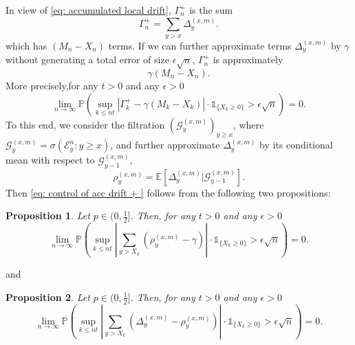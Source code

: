 \documentclass[twoside,12pt,a4paper]{article}
\newtheorem{proposition}{Proposition}[section]
\numberwithin{equation}{section}
\newcommand{\abs}[1]{\left\vert #1 \right\vert}
\begin{document}
In view of \eqref{eq: accumulated local drift}, $\Gamma_n^+$ is the sum 
$$
\Gamma_n^+ = \sum_{y>x} \Delta_y^{(x,m)}.
$$ which has $(M_n - X_n)$ terms. If we can further approximate terms $\Delta_y^{(x,m)}$ by $\gamma$ without generating a total error of size $\epsilon \sqrt{n}$, $\Gamma_n^+$ is approximately 
$$   
 \gamma (M_n - X_n).
$$
More precisely,for any $t>0$ and any $\epsilon >0$
\begin{equation}\label{eq: control of acc drift + }
	\lim_{n \to \infty }\mathbb{P}\left(\sup_{k\leq nt} \abs{\Gamma^+_k - \gamma \left(M_k - X_k \right)   }\cdot \mathbb{1}_{\{X_k\geq 0 \}} > \epsilon \sqrt{n}  \right) =0. 
\end{equation}
To this end, we consider the filtration $\left(\mathcal{G}_{y}^{(x,m)}\right)_{y\geq x}$, where $ \mathcal{G}_{y}^{(x,m)} = \sigma\left( \mathcal{E}^{n}_y : y \geq x \right)$, and further approximate $\Delta_y^{(x,m)}$ by its conditional mean with respect to $\mathcal{G}_{y-1}^{(x,m)}$,
\begin{equation}\label{eq: conditional mean}
	\rho_{y}^{(x,m)}= \mathbb{E}\left[\Delta_y^{(x,m)} | \mathcal{G}_{y-1}^{(x,m)}\right].
\end{equation}
Then \eqref{eq: control of acc drift + } follows from the following two propositions:
\begin{proposition}\label{lm: approximation of means of local drift}
		Let $p\in (0,\frac{1}{2}]$. Then, for any $t>0$ and any $\epsilon >0$
		\begin{equation}\label{eq: control of expected local drift}
			\lim_{n \to \infty }\mathbb{P}\left(\sup_{k\leq nt} \abs{\sum_{y> X_k} \left( \rho_{y}^{(x,m)} - \gamma  \right)   }\cdot\mathbb{1}_{\{X_k\geq 0\}} > \epsilon \sqrt{n}  \right) =0. 
		\end{equation}
\end{proposition}
and
\begin{proposition}\label{lm: approx local drift by conditional means}
	Let $p\in (0,\frac{1}{2}]$. Then, for any $t>0$ and any $\epsilon >0$
	\begin{equation}\label{eq: control of martingale difference for local drift}
		\lim_{n \to \infty }\mathbb{P}\left(\sup_{k\leq nt} \abs{\sum_{y> X_k} \left(\Delta_{y}^{(x,m)}- \rho_{y}^{(x,m)} \right)   } \cdot\mathbb{1}_{\{X_k\geq 0\}} > \epsilon \sqrt{n}  \right) =0. 
	\end{equation}
\end{proposition}
\end{document}

